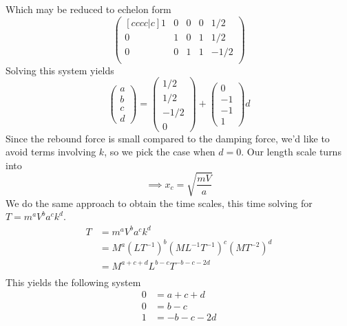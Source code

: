 \documentclass[12pt,twoside]{article}
\begin{document}
Which may be reduced to echelon form
\begin{equation*}
  \begin{pmatrix}[cccc|c]
    1 & 0 & 0 & 0 & 1/2 \\
    0 & 1 & 0 & 1 & 1/2 \\
    0 & 0 & 1 & 1 & -1/2 \\
  \end{pmatrix}
\end{equation*}
Solving this system yields
\begin{equation*}
  \begin{pmatrix}
    a \\ b \\ c \\ d
  \end{pmatrix} =
  \begin{pmatrix}
    1/2 \\ 1/2 \\ -1/2 \\ 0
  \end{pmatrix} +
  \begin{pmatrix}
    0 \\ -1 \\ -1 \\ 1
  \end{pmatrix}
  d
\end{equation*}
Since the rebound force is small compared to the damping force, we'd like to
avoid terms involving $k$, so we pick the case when $d=0$. Our length scale
turns into
\begin{equation}
  \label{eq:4-length-scale}
  \implies x_c = \sqrt{\frac{mV}{a}}
\end{equation}
We do the same approach to obtain the time scales, this time solving for
$T=m^aV^ba^ck^d$.
\begin{equation*}
  \begin{aligned}
    T &= m^aV^ba^ck^d \\
    &= M^{a}(LT^{-1})^b(ML^{-1}T^{-1})^c(MT^{-2})^d \\
    &= M^{a+c+d}L^{b-c}T^{-b-c-2d} \\
  \end{aligned}
\end{equation*}
This yields the following system
\begin{equation*}
  \begin{aligned}
    0 &= a + c + d \\
    0 &= b - c \\
    1 &= -b  - c - 2d \\
  \end{aligned}
\end{equation*}
\end{document}
